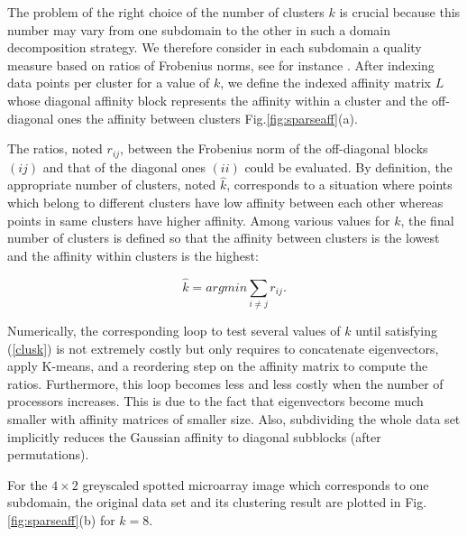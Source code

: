 \documentclass[runningheads,a4paper]{llncs}
\begin{document}
The problem of the right choice of the number of clusters $k$ is crucial
because this number may vary from one subdomain to the other in such
a domain decomposition strategy. We therefore consider in each subdomain a
quality measure based on ratios of Frobenius norms, see for instance
\cite{vec08b}. After indexing data points per cluster for a value of $k$, we
define the indexed affinity matrix $L$ whose diagonal affinity block
represents the affinity within a cluster and the off-diagonal ones the
affinity between clusters Fig.\ref{fig:sparseaff}(a).

The ratios, noted $r_{ij}$, between the Frobenius norm of the off-diagonal
blocks $(ij)$ and that of the diagonal ones $(ii)$ could be evaluated.  By
definition, the appropriate number of clusters, noted $\hat{k}$, corresponds to a
situation where points which belong to different clusters have low affinity
between each other whereas points in same clusters have higher affinity.
Among various values for $k$, the final number of clusters is defined so that
the affinity between clusters is the lowest and the affinity within clusters
is the highest:

\begin{equation}
\hat{k} = argmin \sum_{i\neq j} r_{ij}. \label{clusk}
\end{equation} 

Numerically, the corresponding loop to test several values of $k$ until
satisfying (\ref{clusk}) is not extremely costly but only requires to
concatenate eigenvectors, apply K-means, and a reordering step on the affinity
matrix to compute the ratios.  Furthermore, this loop becomes less and less
costly when the number of processors increases. This is due to the fact that
eigenvectors become much smaller with affinity matrices of smaller size. Also,
subdividing the whole data set implicitly reduces the Gaussian affinity to
diagonal subblocks (after permutations).

For the $4 \times 2$ greyscaled spotted microarray image which corresponds
to one subdomain, the original data set and its clustering result are plotted in
Fig.\ref{fig:sparseaff}(b) for $k=8$.
\end{document}
